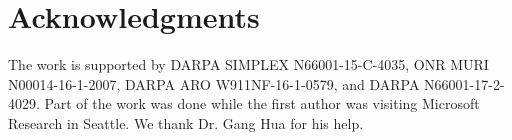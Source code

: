 \documentclass{article}
\begin{document}
\section*{Acknowledgments}

The work is supported by DARPA SIMPLEX N66001-15-C-4035,  ONR MURI N00014-16-1-2007, DARPA ARO W911NF-16-1-0579, and DARPA  N66001-17-2-4029. Part of the work was done while the first author was visiting Microsoft Research in Seattle. We thank Dr. Gang Hua for his help.



\end{document}
